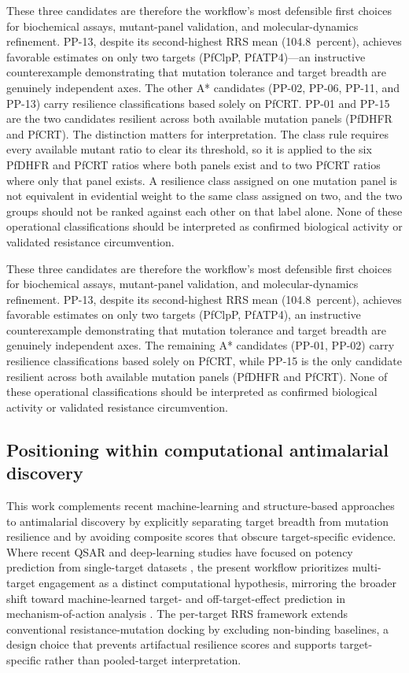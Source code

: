 \documentclass[journal=jcisd8,manuscript=article]{achemso}
\begin{document}
These three candidates are therefore the workflow's most defensible first choices for biochemical assays, mutant-panel validation, and molecular-dynamics refinement. PP-13, despite its second-highest RRS mean (\num{104.8}~percent), achieves favorable estimates on only two targets (PfClpP, PfATP4)—an instructive counterexample demonstrating that mutation tolerance and target breadth are genuinely independent axes. The other A* candidates (PP-02, PP-06, PP-11, and PP-13) carry resilience classifications based solely on PfCRT. PP-01 and PP-15 are the two candidates resilient across both available mutation panels (PfDHFR and PfCRT). The distinction matters for interpretation. The class rule requires every available mutant ratio to clear its threshold, so it is applied to the six PfDHFR and PfCRT ratios where both panels exist and to two PfCRT ratios where only that panel exists. A resilience class assigned on one mutation panel is not equivalent in evidential weight to the same class assigned on two, and the two groups should not be ranked against each other on that label alone. None of these operational classifications should be interpreted as confirmed biological activity or validated resistance circumvention.


These three candidates are therefore the workflow's most defensible first choices for biochemical assays, mutant-panel validation, and molecular-dynamics refinement. PP-13, despite its second-highest RRS mean (\num{104.8}~percent), achieves favorable estimates on only two targets (PfClpP, PfATP4), an instructive counterexample demonstrating that mutation tolerance and target breadth are genuinely independent axes. The remaining A* candidates (PP-01, PP-02) carry resilience classifications based solely on PfCRT, while PP-15 is the only candidate resilient across both available mutation panels (PfDHFR and PfCRT). None of these operational classifications should be interpreted as confirmed biological activity or validated resistance circumvention.


\subsection{Positioning within computational antimalarial discovery}
This work complements recent machine-learning and structure-based approaches to antimalarial discovery by explicitly separating target breadth from mutation resilience and by avoiding composite scores that obscure target-specific evidence. Where recent QSAR and deep-learning studies have focused on potency prediction from single-target datasets \cite{Wells2015,SiqueiraNeto2023,Sentinel2025Offtarget}, the present workflow prioritizes multi-target engagement as a distinct computational hypothesis, mirroring the broader shift toward machine-learned target- and off-target-effect prediction in mechanism-of-action analysis \cite{Trapotsi2022MoA}. The per-target RRS framework extends conventional resistance-mutation docking by excluding non-binding baselines, a design choice that prevents artifactual resilience scores and supports target-specific rather than pooled-target interpretation.
\end{document}
